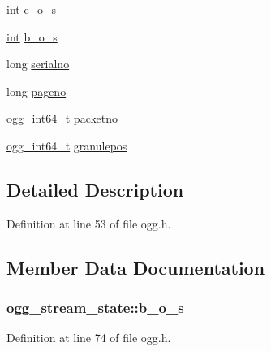 \begin{DoxyCompactItemize}
\item 
\hyperlink{xmltok_8h_a5a0d4a5641ce434f1d23533f2b2e6653}{int} \hyperlink{structogg__stream__state_a366e94e72849e0e880d53a22bb9ee646}{e\+\_\+o\+\_\+s}
\item 
\hyperlink{xmltok_8h_a5a0d4a5641ce434f1d23533f2b2e6653}{int} \hyperlink{structogg__stream__state_a76fcc3bf6a59eff87ec3bee1d16fa0b5}{b\+\_\+o\+\_\+s}
\item 
long \hyperlink{structogg__stream__state_a79248e3f1f41cde5331909e8edd98e10}{serialno}
\item 
long \hyperlink{structogg__stream__state_a0ad3315203fcebdc2ccd3b050d28a65c}{pageno}
\item 
\hyperlink{config__types_8h_a292432ede703993aa88db876e11b2306}{ogg\+\_\+int64\+\_\+t} \hyperlink{structogg__stream__state_a1bebf380025b6ca0841497e7ab2b5c34}{packetno}
\item 
\hyperlink{config__types_8h_a292432ede703993aa88db876e11b2306}{ogg\+\_\+int64\+\_\+t} \hyperlink{structogg__stream__state_a5df750c600660686e29f24b4d1ce836c}{granulepos}
\end{DoxyCompactItemize}


\subsection{Detailed Description}


Definition at line 53 of file ogg.\+h.



\subsection{Member Data Documentation}
\subsubsection[{\texorpdfstring{b\+\_\+o\+\_\+s}{b_o_s}}]{ ogg\+\_\+stream\+\_\+state\+::b\+\_\+o\+\_\+s}\hypertarget{structogg__stream__state_a76fcc3bf6a59eff87ec3bee1d16fa0b5}{}\label{structogg__stream__state_a76fcc3bf6a59eff87ec3bee1d16fa0b5}


Definition at line 74 of file ogg.\+h.

